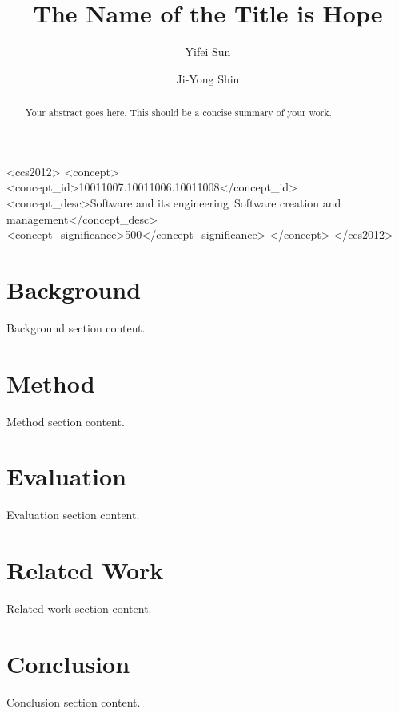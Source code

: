 \documentclass[sigplan,screen,review]{acmart}
\begin{document}
\title{The Name of the Title is Hope}

\author{Yifei Sun}

\author{Ji-Yong Shin}


\renewcommand{\shortauthors}{Sun et al.}

\begin{abstract}
  Your abstract goes here. This should be a concise summary of your work.
\end{abstract}

\begin{CCSXML}
  <ccs2012>
  <concept>
  <concept_id>10011007.10011006.10011008</concept_id>
  <concept_desc>Software and its engineering~Software creation and
  management</concept_desc>
  <concept_significance>500</concept_significance>
  </concept>
  </ccs2012>
\end{CCSXML}



\maketitle







\section{Background}
Background section content.

\section{Method}
Method section content.

\section{Evaluation}
Evaluation section content.

\section{Related Work}
Related work section content.

\section{Conclusion}
Conclusion section content.



\end{document}
